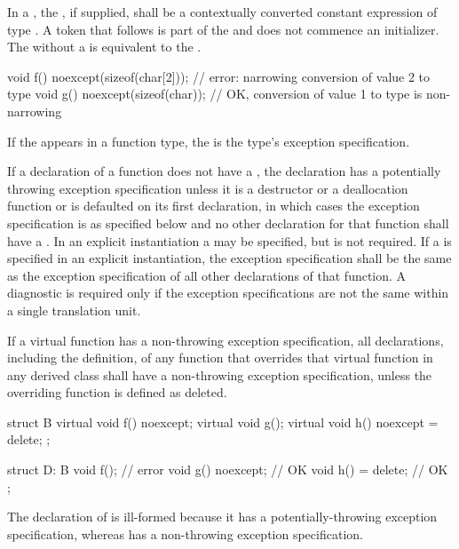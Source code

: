 \pnum
{}%
In a , the ,
if supplied, shall be a contextually converted constant expression
of type .
A \tcode{(} token that follows  is part of the
 and does not commence an
initializer.
The  
without a 
is
equivalent to the 
.
\begin{example}
\begin{codeblock}
void f() noexcept(sizeof(char[2])); // error: narrowing conversion of value 2 to type 
void g() noexcept(sizeof(char));    // OK, conversion of value 1 to type  is non-narrowing
\end{codeblock}
\end{example}

\pnum
If the  appears in a function type,
the  is the type's exception specification.

\pnum
If a declaration of a function
does not have a ,
the declaration has a potentially throwing exception specification
unless it is a destructor or a deallocation function
or is defaulted on its first declaration,
in which cases the exception specification
is as specified below
and no other declaration for that function
shall have a .
In an explicit instantiation
a  may be specified,
but is not required.
If a  is specified
in an explicit instantiation,
the exception specification shall be the same as
the exception specification of all other declarations of that function.
A diagnostic is required only if the
exception specifications are not the same
within a single translation unit.

\pnum
{}%
If a virtual function has a
non-throwing exception specification,
all declarations, including the definition, of any function
that overrides that virtual function in any derived class
shall have a non-throwing
exception specification,
unless the overriding function is defined as deleted.
\begin{example}
\begin{codeblock}
struct B {
  virtual void f() noexcept;
  virtual void g();
  virtual void h() noexcept = delete;
};

struct D: B {
  void f();                     // error
  void g() noexcept;            // OK
  void h() = delete;            // OK
};
\end{codeblock}

The declaration of
is ill-formed because it
has a potentially-throwing exception specification,
whereas
has a non-throwing exception specification.
\end{example}


